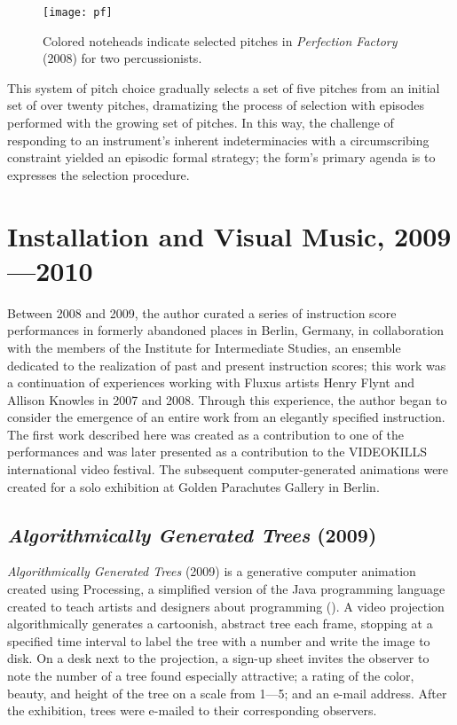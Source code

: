 \begin{figure}[H] 
\texttt{[image: pf]}
\caption{Colored noteheads indicate selected pitches in \emph{Perfection Factory} (2008) for two percussionists. } 
\end{figure}

This system of pitch choice gradually selects a set of five pitches from an initial set of over twenty pitches, dramatizing the process of selection with episodes performed with the growing set of pitches. In this way, the challenge of responding to an instrument's inherent indeterminacies with a circumscribing constraint yielded an episodic formal strategy; the form's primary agenda is to expresses the selection procedure.

\section{Installation and Visual Music, 2009---2010} 

Between 2008 and 2009, the author curated a series of instruction score performances in formerly abandoned places in Berlin, Germany, in collaboration with the members of the Institute for Intermediate Studies, an ensemble dedicated to the realization of past and present instruction scores; this work was a continuation of experiences working with Fluxus artists Henry Flynt and Allison Knowles in 2007 and 2008. Through this experience, the author began to consider the emergence of an entire work from an elegantly specified instruction. The first work described here was created as a contribution to one of the performances and was later presented as a contribution to the VIDEOKILLS international video festival. The subsequent computer-generated animations were created for a solo exhibition at Golden Parachutes Gallery in Berlin.

\subsection{\emph{Algorithmically Generated Trees} (2009)}

\emph{Algorithmically Generated Trees} (2009) is a generative computer animation created using Processing, a simplified version of the Java programming language created to teach artists and designers about programming (\cite{reas2007processing}). A video projection algorithmically generates a cartoonish, abstract tree each frame, stopping at a specified time interval to label the tree with a number and write the image to disk. On a desk next to the projection, a sign-up sheet invites the observer to note the number of a tree found especially attractive; a rating of the color, beauty, and height of the tree on a scale from 1---5; and an e-mail address. After the exhibition, trees were e-mailed to their corresponding observers. 

